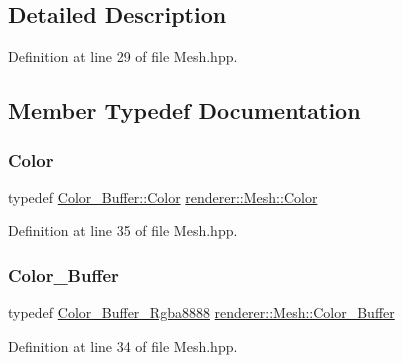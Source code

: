 \subsection{Detailed Description}


Definition at line 29 of file Mesh.\+hpp.



\subsection{Member Typedef Documentation}
\mbox{\label{classrenderer_1_1_mesh_a71276bd4511d4593f1deaae6d464e811}} 
\subsubsection{\texorpdfstring{Color}{Color}}
{\footnotesize\ttfamily typedef \mbox{\hyperlink{structrenderer_1_1_color___buffer___rgba8888_1_1_color}{Color\+\_\+\+Buffer\+::\+Color}} \mbox{\hyperlink{classrenderer_1_1_mesh_a71276bd4511d4593f1deaae6d464e811}{renderer\+::\+Mesh\+::\+Color}}}



Definition at line 35 of file Mesh.\+hpp.

\mbox{\label{classrenderer_1_1_mesh_aeb2cb93e67b18f09a15e7ece644f919b}} 
\subsubsection{\texorpdfstring{Color\_Buffer}{Color\_Buffer}}
{\footnotesize\ttfamily typedef \mbox{\hyperlink{classrenderer_1_1_color___buffer___rgba8888}{Color\+\_\+\+Buffer\+\_\+\+Rgba8888}} \mbox{\hyperlink{classrenderer_1_1_mesh_aeb2cb93e67b18f09a15e7ece644f919b}{renderer\+::\+Mesh\+::\+Color\+\_\+\+Buffer}}}



Definition at line 34 of file Mesh.\+hpp.

\mbox{\label{classrenderer_1_1_mesh_a6a226cb85370a00787fe01f70a0b5ca2}} 
